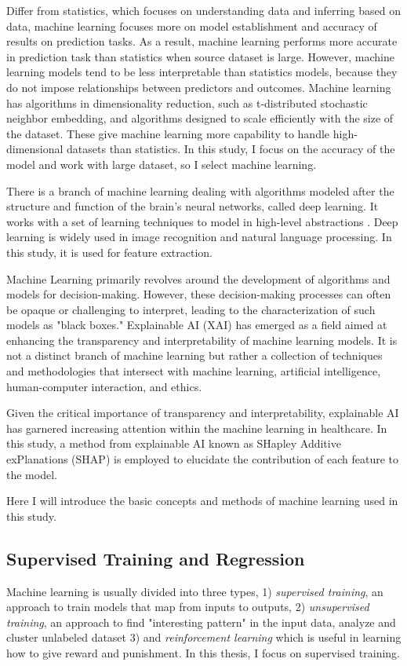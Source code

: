 \documentclass[12pt,a4paper,english
]{tunithesis}
\begin{document}
Differ from statistics, which focuses on understanding data and inferring based on data, machine learning focuses more on model establishment and accuracy of results on prediction tasks. As a result, machine learning performs more accurate in prediction task than statistics when source dataset is large. However, machine learning models tend to be less interpretable than statistics models, because they do not impose relationships between predictors and outcomes. Machine learning has algorithms in dimensionality reduction, such as t-distributed stochastic neighbor embedding, and algorithms designed to scale efficiently with the size of the dataset. These give machine learning more capability to handle high-dimensional datasets than statistics. \parencite{Bzdok2018, Rajula2020, turin2020} In this study, I focus on the accuracy of the model and work with large dataset, so I select machine learning.

There is a branch of machine learning dealing with algorithms modeled after the structure and function of the brain's neural networks, called deep learning. It works with a set of learning techniques to model in high-level abstractions \parencite{kevin2012}. Deep learning is widely used in image recognition and natural language processing. In this study, it is used for feature extraction.

Machine Learning primarily revolves around the development of algorithms and models for decision-making. However, these decision-making processes can often be opaque or challenging to interpret, leading to the characterization of such models as "black boxes." Explainable AI (XAI) has emerged as a field aimed at enhancing the transparency and interpretability of machine learning models. It is not a distinct branch of machine learning but rather a collection of techniques and methodologies that intersect with machine learning, artificial intelligence, human-computer interaction, and ethics. \parencite{turri2022}

Given the critical importance of transparency and interpretability, explainable AI has garnered increasing attention within the machine learning in healthcare. In this study, a method from explainable AI known as SHapley Additive exPlanations (SHAP) \parencite{lundberg2017} is employed to elucidate the contribution of each feature to the model.

Here I will introduce the basic concepts and methods of machine learning used in this study. 

\subsection{Supervised Training and Regression}
Machine learning is usually divided into three types, 1) \textit{supervised training}, an approach to train models that  map from inputs to outputs, 2) \textit{unsupervised training},  an approach to find "interesting pattern" in the input data, analyze and cluster unlabeled dataset 3) and \textit{reinforcement learning} which is useful in learning how to give reward and punishment. In this thesis, I focus on supervised training. \parencite{kevin2012, WANG2023}
\end{document}
